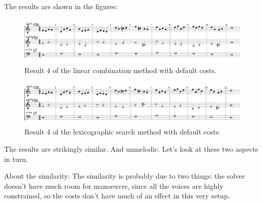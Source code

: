 The results are shown in the figures:

\begin{figure}[h]
    \centering
    \includegraphics[width=1\textwidth]{Images/Experiments/linear-combination-2sp.png}
    \caption{Result 4 of the linear combination method with default costs.}
    \label{fig:combili-2sp}
\end{figure}

\begin{figure}[h]
    \centering
    \includegraphics[width=1\textwidth]{Images/Experiments/basic-lexico-2sp.png}
    \caption{Result 4 of the lexicographic search method with default costs.}
    \label{fig:lexico-2sp}
\end{figure}

The results are strikingly similar. And unmelodic. Let's look at these two aspects in turn.


About the similarity: The similarity is probably due to two things: the solver doesn't have much room for manoeuvre, since all the voices are highly constrained, so the costs don't have much of an effect in this very setup. 

